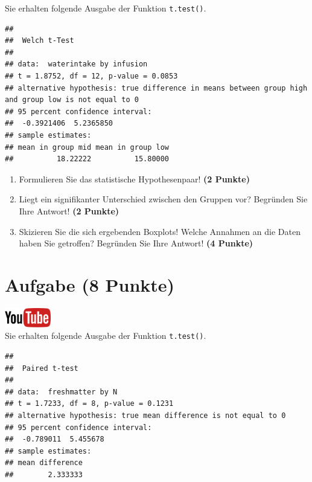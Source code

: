 \documentclass[a4paper, 10pt]{scrartcl}\usepackage[]{graphicx}\usepackage[]{xcolor}
\makeatletter
\newenvironment{kframe}{%
 \def\at@end@of@kframe{}%
 \ifinner\ifhmode%
  \def\at@end@of@kframe{\end{minipage}}%
  \begin{minipage}{\columnwidth}%
 \fi\fi%
 \def\FrameCommand##1{\hskip\@totalleftmargin \hskip-\fboxsep
 \colorbox{shadecolor}{##1}\hskip-\fboxsep
     \hskip-\linewidth \hskip-\@totalleftmargin \hskip\columnwidth}%
 \MakeFramed {\advance\hsize-\width
   \@totalleftmargin\z@ \linewidth\hsize
   \@setminipage}}%
 {\par\unskip\endMakeFramed%
 \at@end@of@kframe}
\newenvironment{knitrout}{}{} %
\makeatother
\begin{document}
Sie erhalten folgende \Rlogo Ausgabe der Funktion \texttt{t.test()}.

\begin{knitrout}
\color{fgcolor}\begin{kframe}
\begin{verbatim}
## 
## 	Welch t-Test
## 
## data:  waterintake by infusion
## t = 1.8752, df = 12, p-value = 0.0853
## alternative hypothesis: true difference in means between group high and group low is not equal to 0
## 95 percent confidence interval:
##  -0.3921406  5.2365850
## sample estimates:
## mean in group mid mean in group low 
##          18.22222          15.80000
\end{verbatim}
\end{kframe}
\end{knitrout}


\begin{enumerate}
  \item Formulieren Sie das statistische Hypothesenpaar! \textbf{(2
Punkte)}
\item Liegt ein signifikanter Unterschied zwischen den Gruppen vor?
  Begr{\"u}nden Sie Ihre Antwort! \textbf{(2 Punkte)}
\item Skizieren Sie die sich ergebenden Boxplots! Welche Annahmen an die Daten haben Sie getroffen? Begr{\"u}nden Sie Ihre Antwort! \textbf{(4 Punkte)} 
\end{enumerate}
 
\clearpage

\section{Aufgabe \hfill (8 Punkte)}

\hfill\href{https://youtu.be/kHmfEmU6lrk}{\includegraphics[width =
  2cm]{img/youtube}}\\[1Ex]


Sie erhalten folgende \Rlogo Ausgabe der Funktion \texttt{t.test()}.

\begin{knitrout}
\color{fgcolor}\begin{kframe}
\begin{verbatim}
## 
## 	Paired t-test
## 
## data:  freshmatter by N
## t = 1.7233, df = 8, p-value = 0.1231
## alternative hypothesis: true mean difference is not equal to 0
## 95 percent confidence interval:
##  -0.789011  5.455678
## sample estimates:
## mean difference 
##        2.333333
\end{verbatim}
\end{kframe}
\end{knitrout}
\end{document}
